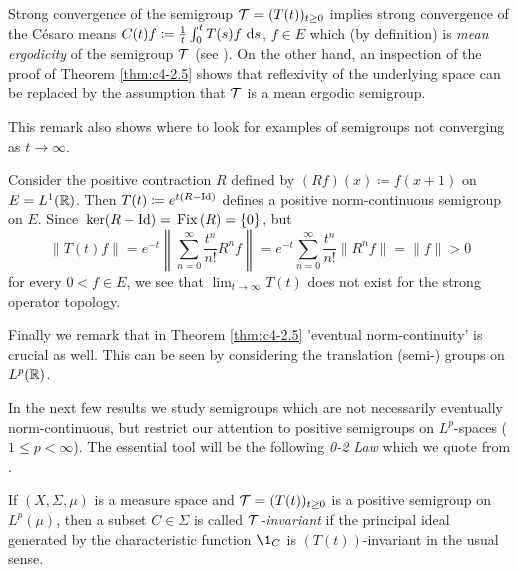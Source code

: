 Strong convergence of the semigroup $\mathcal{T} = (T(t))_{t \geq 0}$ implies strong convergence of the Césaro means $C(t)f \coloneqq  \frac{1}{t}\int_{0}^{t} T(s)f \, \mathop{}\!\mathrm{d}{s}$, $f \in E$ which (by definition) is \emph{mean ergodicity} of the semigroup $\mathcal{T}$ (see \citet[Chap.5.1]{davies:1980}).
On the other hand, an inspection of the proof of Theorem \ref{thm:c4-2.5} shows that reflexivity of the underlying space can be replaced by the assumption that $\mathcal{T}$ is a mean ergodic semigroup.

This remark also shows where to look for examples of semigroups not converging as $t \to \infty$.

Consider the positive contraction $R$ defined by $(Rf)(x) \coloneqq f(x+1)$ on $E = L^{1}(\mathbb{R})$.
Then $T(t) \coloneqq e^{t(R-\operatorname{Id})}$ defines a positive norm-continuous semigroup on $E$.
Since $\mathop{}\mathrm{ker}(R - \operatorname{Id}) = \mathop{}\mathrm{Fix}\left(R\right) = \{0\}$, but 
\[
\|T(t)f\| = e^{-t} \left\|\sum_{n=0}^{\infty} \frac{t^n}{n!}R^{n}f\right\| = 
e^{-t}\sum_{n=0}^{\infty} \frac{t^n}{n!}\|R^{n}f\|= \|f\| > 0
\] 
for every $0 < f \in E$, we see that $\lim_{t\to\infty} T(t)$ does not exist for the strong operator topology.

Finally we remark that in Theorem \ref{thm:c4-2.5} 'eventual norm-continuity' is crucial as well.
This can be seen by considering the translation (semi-) groups on $L^{p}(\mathbb{R})$.

In the next few results we study semigroups which are not necessarily eventually norm-continuous, but restrict our attention to positive semigroups on $L^{p}$-spaces ($1 \leq p < \infty$).
The essential tool will be the following \emph{0-2 Law} which we quote from \citet[Theorem~3.7]{greiner:1982}.

If $(X, \Sigma, \mu)$ is a measure space and $\mathcal{T} = (T(t))_{t \geq 0}$ is a positive semigroup on $L^{p}(\mu)$, then a subset $C \in \Sigma$ is called \emph{$\mathcal{T}$-invariant} if the principal ideal generated by the characteristic function $\1_{C}$ is $(T(t))$-invariant in the usual sense.

